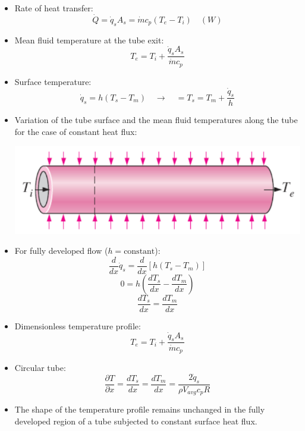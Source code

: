 \documentclass[11pt]{article}
\begin{document}
\begin{itemize}
\item Rate of heat transfer:
\[\dot{Q} = \dot{q}_s A_s = \dot{m} c_p (T_e - T_i) \quad (\unit{W})\]
\item Mean fluid temperature at the tube exit:
\[T_e = T_i + \frac{\dot{q}_s A_s}{\dot{m} c_p}\]
\item Surface temperature:
\[\dot{q}_s = h (T_s - T_m) \quad \rightarrow \quad = T_s = T_m + \frac{\dot{q}_s}{h}\]
\item Variation of the tube surface and the mean fluid temperatures along the tube for the case of constant heat flux:
\begin{center}
\includegraphics[width=.9\linewidth]{./images/constant-surface-heat-flux-variation-along-the-tube.png}
\end{center}
\item For fully developed flow (\(h = \text{constant}\)):
\[\frac{d}{dx} \dot{q}_s = \frac{d}{dx} [h(T_s - T_m)]\]
\[0 = h \left(\frac{dT_s}{dx} - \frac{dT_m}{dx} \right)\]
\[\frac{dT_s}{dx} = \frac{dT_m}{dx}\]
\item Dimensionless temperature profile:
\[T_e = T_i + \frac{\dot{q}_s A_s}{\dot{m} c_p}\]
\item Circular tube:
\[\frac{\partial T}{\partial x} = \frac{dT_s}{dx} = \frac{dT_m}{dx} = \frac{2 \dot{q}_s}{\rho V_{avg} c_p R}\]
\item The shape of the temperature profile remains unchanged in the fully developed region of a tube subjected to constant surface heat flux.
\end{itemize}
\end{document}
